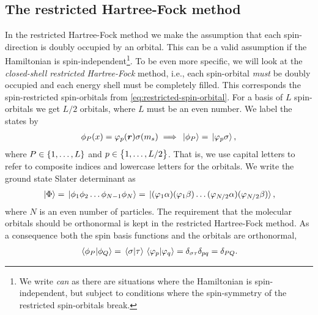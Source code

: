         \subsection{The restricted Hartree-Fock method}
            \label{subsec:rhf}
            In the restricted Hartree-Fock method we make the assumption that
            each spin-direction is doubly occupied by an orbital.
            This can be a valid assumption if the Hamiltonian is
            spin-independent\footnote{%
                We write \emph{can} as there are situations where the
                Hamiltonian is spin-independent, but subject to conditions where
                the spin-symmetry of the restricted spin-orbitals break.
            }.
            To be even more specific, we will look at the \emph{closed-shell
            restricted Hartree-Fock} method, i.e., each spin-orbital \emph{must}
            be doubly occupied and each energy shell must be completely filled.
            This corresponds the spin-restricted spin-orbitals from
            \autoref{eq:restricted-spin-orbital}.
            For a basis of $L$ spin-orbitals we get $L/2$ orbitals, where $L$
            must be an even number.
            We label the states by
            \begin{align}
                \phi_{P}(x) = \varphi_p(\boldsymbol{r}) \sigma(m_s)
                \implies
                \ket*{\phi_P} = \ket*{\varphi_p\sigma},
            \end{align}
            where $P \in \left\{ 1, \dots, L \right\}$ and $p \in \left\{ 1, \dots, L / 2 \right\}$.
            That is, we use capital letters to refer to composite indices and
            lowercase letters for the orbitals.
            We write the ground state Slater determinant as
            \begin{align}
                \ket*{\Phi} = \ket*{\phi_1 \phi_2 \dots \phi_{N - 1} \phi_N}
                = \ket*{
                    (\varphi_1 \alpha)
                    (\varphi_1 \beta)
                    \dots
                    (\varphi_{N / 2} \alpha)
                    (\varphi_{N / 2}\beta)
                },
            \end{align}
            where $N$ is an even number of particles.
            The requirement that the molecular orbitals should be orthonormal is
            kept in the restricted Hartree-Fock method.
            As a consequence both the spin basis functions and the orbitals are
            orthonormal,
            \begin{align}
                \braket*{\phi_P}{\phi_Q}
                = \braket*{\sigma}{\tau}
                \braket*{\varphi_p}{\varphi_q}
                = \delta_{\sigma \tau}
                \delta_{pq}
                = \delta_{PQ}.
            \end{align}
